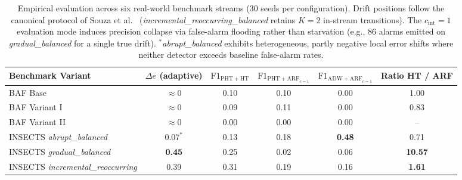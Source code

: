 \begin{table}[ht]
  \centering
  \caption{Empirical evaluation across six real-world benchmark streams (30 seeds per configuration). Drift positions follow the canonical protocol of Souza et al.~\cite{souza_insects_2020} (\textit{incremental\_reoccurring\_balanced} retains $K=2$ in-stream transitions). The $c_{\mathrm{int}}=1$ evaluation mode induces precision collapse via false-alarm flooding rather than starvation (e.g., 86 alarms emitted on \textit{gradual\_balanced} for a single true drift). $^{\ast}$\textit{abrupt\_balanced} exhibits heterogeneous, partly negative local error shifts where neither detector exceeds baseline false-alarm rates.}
  \label{tab:real_data_summary}
  \small
  \setlength{\tabcolsep}{8pt}
  \begin{tabular}{@{}lccccc@{}}
    \toprule
    Benchmark Variant                         & $\Delta e$ (adaptive) & $\text{F1}_{\mathrm{PHT+HT}}$ & $\text{F1}_{\mathrm{PHT+ARF}_{c=1}}$ & $\text{F1}_{\mathrm{ADW+ARF}_{c=1}}$ & Ratio HT / ARF \\
    \midrule
    BAF Base                                  & $\approx 0$           & 0.10                          & 0.10                                 & 0.00                                 & 1.00           \\
    BAF Variant I                             & $\approx 0$           & 0.09                          & 0.11                                 & 0.00                                 & 0.83           \\
    BAF Variant II                            & $\approx 0$           & 0.00                          & 0.00                                 & 0.00                                 & --             \\
    INSECTS \textit{abrupt\_balanced}         & $0.07^{\ast}$         & 0.13                          & 0.18                                 & \textbf{0.48}                        & 0.71           \\
    INSECTS \textit{gradual\_balanced}        & \textbf{0.45}         & 0.25                          & 0.02                                 & 0.06                                 & \textbf{10.57} \\
    INSECTS \textit{incremental\_reoccurring} & 0.39                  & 0.31                          & 0.19                                 & 0.16                                 & \textbf{1.61}  \\
    \bottomrule
  \end{tabular}
\end{table}
